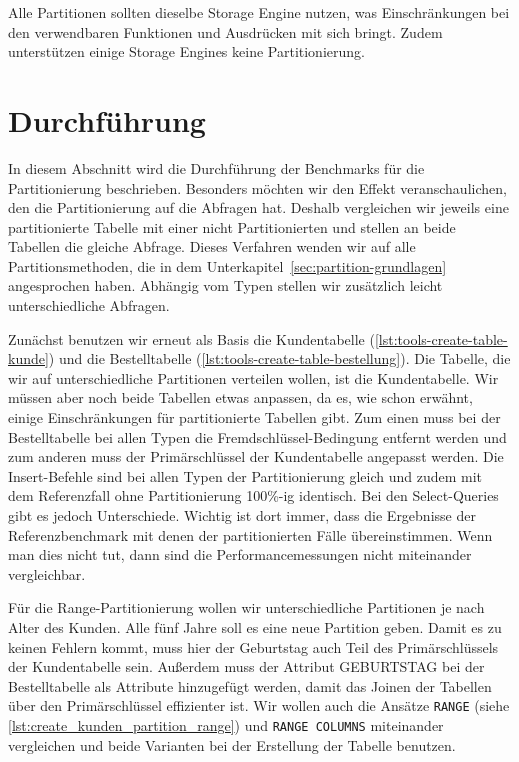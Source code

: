 Alle Partitionen sollten dieselbe Storage Engine nutzen, was Einschränkungen bei den verwendbaren Funktionen und Ausdrücken mit sich bringt.
Zudem unterstützen einige Storage Engines keine Partitionierung.

\section{Durchführung}\label{sec:partition-durchfuhrung}
In diesem Abschnitt wird die Durchführung der Benchmarks für die Partitionierung beschrieben.
Besonders möchten wir den Effekt veranschaulichen, den die Partitionierung auf die Abfragen hat.
Deshalb vergleichen wir jeweils eine partitionierte Tabelle mit einer nicht Partitionierten und stellen an beide Tabellen die gleiche Abfrage.
Dieses Verfahren wenden wir auf alle Partitionsmethoden, die in dem Unterkapitel~\ref{sec:partition-grundlagen} angesprochen haben.
Abhängig vom Typen stellen wir zusätzlich leicht unterschiedliche Abfragen.

Zunächst benutzen wir erneut als Basis die Kundentabelle (\ref{lst:tools-create-table-kunde}) und die Bestelltabelle (\ref{lst:tools-create-table-bestellung}).
Die Tabelle, die wir auf unterschiedliche Partitionen verteilen wollen, ist die Kundentabelle.
Wir müssen aber noch beide Tabellen etwas anpassen, da es, wie schon erwähnt, einige Einschränkungen für partitionierte Tabellen gibt.
Zum einen muss bei der Bestelltabelle bei allen Typen die Fremdschlüssel-Bedingung entfernt werden und zum anderen muss der Primärschlüssel der Kundentabelle angepasst werden.
Die Insert-Befehle sind bei allen Typen der Partitionierung gleich und zudem mit dem Referenzfall ohne Partitionierung 100\%-ig identisch.
Bei den Select-Queries gibt es jedoch Unterschiede.
Wichtig ist dort immer, dass die Ergebnisse der Referenzbenchmark mit denen der partitionierten Fälle übereinstimmen.
Wenn man dies nicht tut, dann sind die Performancemessungen nicht miteinander vergleichbar.

Für die Range-Partitionierung wollen wir unterschiedliche Partitionen je nach Alter des Kunden.
Alle fünf Jahre soll es eine neue Partition geben.
Damit es zu keinen Fehlern kommt, muss hier der Geburtstag auch Teil des Primärschlüssels der Kundentabelle sein.
Außerdem muss der Attribut GEBURTSTAG bei der Bestelltabelle als Attribute hinzugefügt werden, damit das Joinen der Tabellen über den Primärschlüssel effizienter ist.
Wir wollen auch die Ansätze \texttt{RANGE} (siehe \ref{lst:create_kunden_partition_range}) und \texttt{RANGE COLUMNS} miteinander vergleichen und beide Varianten bei der Erstellung der Tabelle benutzen.

